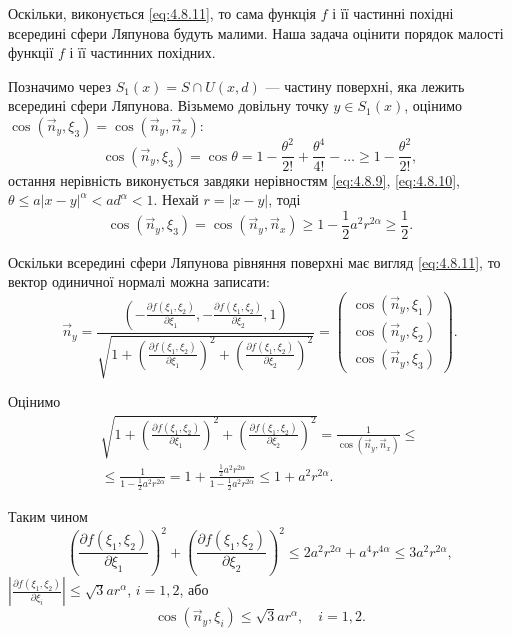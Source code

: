 Оскільки, виконується \eqref{eq:4.8.11}, то сама функція $f$ і її частинні похідні всередині сфери Ляпунова будуть малими. Наша задача оцінити порядок малості функції $f$ і її частинних похідних. \medskip

Позначимо через $S_1(x) = S \cap U(x, d)$ --- частину поверхні, яка лежить всередині сфери Ляпунова. Візьмемо довільну точку $y \in S_1(x)$, оцінимо $\cos(\vec n_y, \xi_3) = \cos(\vec n_y, \vec n_x)$:
\begin{equation}
	\cos(\vec n_y, \xi_3) = \cos \theta = 1 - \frac{\theta^2}{2!} + \frac{\theta^4}{4!} - \ldots \ge 1 - \frac{\theta^2}{2!},
\end{equation}
остання нерівність виконується завдяки нерівностям \eqref{eq:4.8.9}, \eqref{eq:4.8.10}, $\theta \le a |x - y|^\alpha < a d^\alpha < 1$. Нехай $r = |x - y|$, тоді
\begin{equation}
	\label{eq:4.8.13}
	\cos(\vec n_y, \xi_3) = \cos(\vec n_y, \vec n_x) \ge 1 - \frac12 a^2 r^{2\alpha} \ge \frac12.
\end{equation}

Оскільки всередині сфери Ляпунова рівняння поверхні має вигляд \eqref{eq:4.8.11}, то вектор одиничної нормалі можна записати:
\begin{equation}
	\label{eq:4.8.14}
	\vec n_y = \frac{\left(-\frac{\partial f(\xi_1, \xi_2)}{\partial \xi_1}, -\frac{\partial f(\xi_1, \xi_2)}{\partial \xi_2}, 1\right)}{\sqrt{1 + \left(\frac{\partial f(\xi_1, \xi_2)}{\partial \xi_1}\right)^2 + \left(\frac{\partial f(\xi_1, \xi_2)}{\partial \xi_2}\right)^2}} = \begin{pmatrix} \cos(\vec n_y, \xi_1) \\ \cos(\vec n_y, \xi_2) \\ \cos(\vec n_y, \xi_3) \end{pmatrix}.
\end{equation}

Оцінимо
\begin{multline}
	\sqrt{1 + \left(\frac{\partial f(\xi_1, \xi_2)}{\partial \xi_1}\right)^2 + \left(\frac{\partial f(\xi_1, \xi_2)}{\partial \xi_2}\right)^2} = \frac{1}{\cos(\vec n_y, \vec n_x)} \le \\
	\le \frac{1}{1 - \frac12 a^2 r^{2 \alpha}} = 1 + \frac{\frac12 a^2 r^{2 \alpha}}{1 - \frac12 a^2 r^{2 \alpha}} \le 1 + a^2 r^{2 \alpha}.
\end{multline}

Таким чином 
\begin{equation}
	\left(\frac{\partial f(\xi_1, \xi_2)}{\partial \xi_1}\right)^2 + \left(\frac{\partial f(\xi_1, \xi_2)}{\partial \xi_2}\right)^2 \le 2a^2 r^{2\alpha} + a^4 r^{4\alpha} \le 3a^2 r^{2\alpha},
\end{equation}
$\left|\frac{\partial f(\xi_1, \xi_2)}{\partial \xi_i}\right| \le \sqrt{3} a r^\alpha$, $i = 1, 2$, або
\begin{equation}
	\label{eq:4.8.15}
	\cos(\vec n_y, \xi_i) \le \sqrt{3} a r^{\alpha}, \quad i = 1, 2.
\end{equation}

